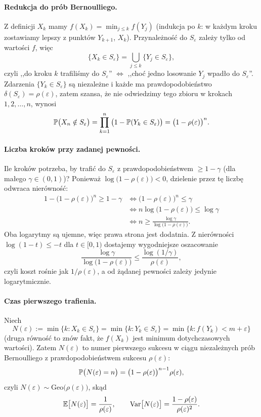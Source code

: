 \documentclass[dvipsnames]{book}
\begin{document}
\paragraph{Redukcja do prób Bernoulliego.}
Z definicji $X_k$ mamy $f(X_k) = \min_{j \leq k} f(Y_j)$ (indukcja po $k$: w
każdym kroku zostawiamy lepszy z punktów $Y_{k+1}$, $X_k$). Przynależność do
$S_\varepsilon$ zależy tylko od wartości $f$, więc
\[
  \{X_k \in S_\varepsilon\} = \bigcup_{j \leq k} \{Y_j \in S_\varepsilon\},
\]
czyli ,,do kroku $k$ trafiliśmy do $S_\varepsilon$'' $\iff$ ,,choć jedno
losowanie $Y_j$ wpadło do $S_\varepsilon$''. Zdarzenia
$\{Y_k \in S_\varepsilon\}$ są niezależne i każde ma prawdopodobieństwo
$\delta(S_\varepsilon) = \rho(\varepsilon)$, zatem szansa, że nie odwiedzimy
tego zbioru w krokach $1, 2, \ldots, n$, wynosi
\[
  \P\big(X_n \notin S_\varepsilon\big)
  = \prod_{k=1}^{n} \big(1 - \P(Y_k \in S_\varepsilon)\big)
  = \big(1-\rho(\varepsilon)\big)^n.
\]

\paragraph{Liczba kroków przy zadanej pewności.}
Ile kroków potrzeba, by trafić do $S_\varepsilon$ z prawdopodobieństwem
$\geq 1 - \gamma$ (dla małego $\gamma \in (0,1)$)? Ponieważ
$\log\big(1-\rho(\varepsilon)\big) < 0$, dzielenie przez tę liczbę odwraca
nierówność:
\begin{align*}
  1 - \big(1-\rho(\varepsilon)\big)^n \geq 1 - \gamma
  &\iff \big(1-\rho(\varepsilon)\big)^n \leq \gamma \\
  &\iff n \log\big(1-\rho(\varepsilon)\big) \leq \log \gamma \\
  &\iff n \geq \frac{\log \gamma}{\log\big(1-\rho(\varepsilon)\big)}.
\end{align*}
Oba logarytmy są ujemne, więc prawa strona jest dodatnia. Z nierówności
$\log(1-t) \leq -t$ dla $t \in [0,1)$ dostajemy wygodniejsze oszacowanie
\[
  \frac{\log \gamma}{\log\big(1-\rho(\varepsilon)\big)}
  \leq \frac{\log(1/\gamma)}{\rho(\varepsilon)},
\]
czyli koszt rośnie jak $1/\rho(\varepsilon)$, a od żądanej pewności zależy
jedynie logarytmicznie.

\paragraph{Czas pierwszego trafienia.}
Niech
\[
  N(\varepsilon) := \min\{k : X_k \in S_\varepsilon\}
  = \min\{k : Y_k \in S_\varepsilon\}
  = \min\{k : f(Y_k) < m + \varepsilon\}
\]
(druga równość to znów fakt, że $f(X_k)$ jest minimum dotychczasowych wartości).
Zatem $N(\varepsilon)$ to numer pierwszego sukcesu w ciągu niezależnych prób
Bernoulliego z prawdopodobieństwem sukcesu $\rho(\varepsilon)$:
\[
  \P\big(N(\varepsilon) = n\big) = \big(1-\rho(\varepsilon)\big)^{n-1} \rho(\varepsilon),
\]
czyli $N(\varepsilon) \sim \mathrm{Geo}\big(\rho(\varepsilon)\big)$, skąd
\[
  \E\big[N(\varepsilon)\big] = \frac{1}{\rho(\varepsilon)},
  \qquad
  \mathrm{Var}\big[N(\varepsilon)\big] = \frac{1 - \rho(\varepsilon)}{\rho(\varepsilon)^2}.
\]
\end{document}
